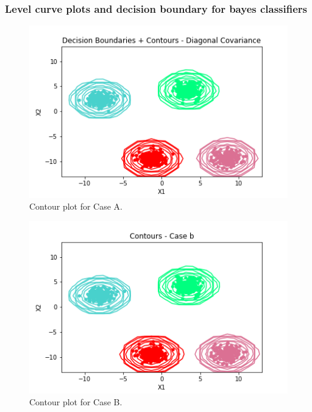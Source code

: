 \documentclass[11pt,a4paper]{article}
\begin{document}
\subsubsection{Level curve plots and decision boundary for bayes classifiers}
\begin{minipage}{0.5\textwidth}
\begin{figure}[H]
    \centering
    \includegraphics[scale=0.6]{images/contour1b_case1.png}
    \caption{Contour plot for Case A.}
    \label{fig:cp_1}
\end{figure}
\end{minipage}%
\begin{minipage}{0.5\textwidth}
\begin{figure}[H]
    \centering
    \includegraphics[scale=0.6]{images/contour1b_case2.png}
    \caption{Contour plot for Case B.}
    \label{fig:cp_2}
\end{figure}
\end{minipage}
\end{document}
